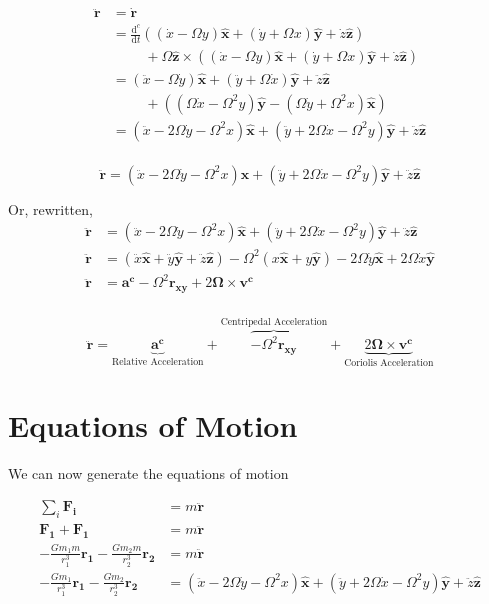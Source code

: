 \documentclass{article}
\newcommand{\dd}[2]{\frac{\mathrm{d}#1}{\mathrm{d}#2}}
\newcommand{\vv}[1]{\bm{#1}}
\newcommand{\vh}[1]{\bm{\hat{#1}}}
\begin{document}
\[
\begin{aligned}
    \vv{\ddot{r}}&=\dot{\vv{r}}\\
    &=\dd{^c}{t}\left(\left(\dot{x}-\Omega y\right)\vh{x}+\left(\dot{y}+\Omega x\right)\vh{y}+\dot{z}\vh{z}\right)\\
        &\phantom{=}\quad+\Omega \vh{z}\times\left(\left(\dot{x}-\Omega y\right)\vh{x}+\left(\dot{y}+\Omega x\right)\vh{y}+\dot{z}\vh{z}\right)\\
    &=\left(\ddot{x}-\Omega \dot{y}\right)\vh{x}+\left(\ddot{y}+\Omega \dot{x}\right)\vh{y}+\ddot{z}\vh{z}\\
        &\phantom{=}\quad+\left(\left(\Omega\dot{x}-\Omega^2 y\right)\vh{y}-\left(\Omega\dot{y}+\Omega^2 x\right)\vh{x}\right)\\
    &=\left(\ddot{x}-2\Omega\dot{y}-\Omega^2 x\right)\vh{x} + \left(\ddot{y}+2\Omega\dot{x}-\Omega^2 y\right)\vh{y}+\ddot{z}\vh{z}\\
\end{aligned}
\]

\[\boxed{\vv{\ddot{r}}=\left(\ddot{x}-2\Omega\dot{y}-\Omega^2 x\right)\vh{x} + \left(\ddot{y}+2\Omega\dot{x}-\Omega^2 y\right)\vh{y}+\ddot{z}\vh{z}}\]

Or, rewritten,
\[\begin{aligned}
    \vv{\ddot{r}} & = \left(\ddot{x}-2\Omega\dot{y}-\Omega^2 x\right)\vh{x} + \left(\ddot{y}+2\Omega\dot{x}-\Omega^2 y\right)\vh{y}+\ddot{z}\vh{z}\\
    \vv{\ddot{r}} & = \left(\ddot{x}\vh{x}+\ddot{y}\vh{y}+\ddot{z}\vh{z}\right) - \Omega^2\left(x\vh{x}+y\vh{y}\right)-2\Omega\dot{y}\vh{x} + 2\Omega\dot{x}\vh{y}\\
    \vv{\ddot{r}} & = \vv{a^c} - \Omega^2\vv{r_{xy}} + 2\vv{\Omega}\times\vv{v^c}\\
\end{aligned}\]

\[\boxed{\vv{\ddot{r}} = \underbrace{\vv{a^c}}_\text{Relative Acceleration} + \overbrace{- \Omega^2\vv{r_{xy}}}^\text{Centripedal Acceleration} + \underbrace{2\vv{\Omega}\times\vv{v^c}}_\text{Coriolis Acceleration}}\]
\section*{Equations of Motion}
We can now generate the equations of motion

\[\begin{aligned}
\sum_i \vv{F_i}&=m\vv{\ddot{r}}\\
\vv{F_1}+\vv{F_1}&=m\vv{\ddot{r}}\\
-\frac{Gm_1m}{r_1^3}\vv{r_1}-\frac{Gm_2m}{r_2^3}\vv{r_2}&=m\vv{\ddot{r}}\\
-\frac{Gm_1}{r_1^3}\vv{r_1}-\frac{Gm_2}{r_2^3}\vv{r_2}&=\left(\ddot{x}-2\Omega\dot{y}-\Omega^2 x\right)\vh{x} + \left(\ddot{y}+2\Omega\dot{x}-\Omega^2 y\right)\vh{y}+\ddot{z}\vh{z}
\end{aligned}\]
\end{document}
